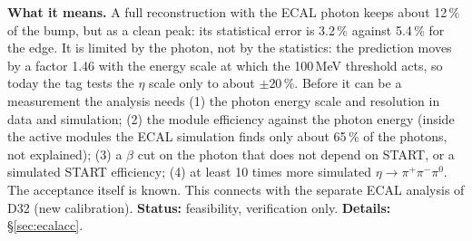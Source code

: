 \documentclass[11pt,a4paper]{article}
\newcommand{\piz}{\ensuremath{\pi^{0}}\xspace}
\newcommand{\pipi}{\ensuremath{\pi^{+}\pi^{-}}\xspace}
\begin{document}
\textbf{What it means.} A full reconstruction with the ECAL photon keeps about 12\,\% of the bump, but as a clean peak: its statistical error is
3.2\,\% against 5.4\,\% for the edge. It is limited by the photon, not by the statistics: the prediction moves by a factor 1.46 with the energy
scale at which the 100\,MeV threshold acts, so today the tag tests the $\eta$ scale only to about $\pm20$\,\%. Before it can be a measurement the
analysis needs (1) the photon energy scale and resolution in data and simulation; (2) the module efficiency against the photon energy (inside
the active modules the ECAL simulation finds only about 65\,\% of the photons, not explained); (3) a $\beta$ cut on the photon that does not
depend on START, or a simulated START efficiency; (4) at least 10 times more simulated $\eta\to\pipi\piz$. The acceptance itself is known. This
connects with the separate ECAL analysis of D32 (new calibration). \textbf{Status:} feasibility, verification only. \textbf{Details:}
\S\ref{sec:ecalacc}.

\end{document}
